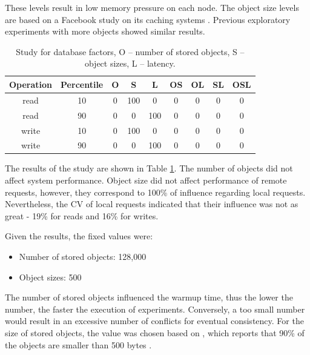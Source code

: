 \documentclass[man,floatsintext,12pt]{apa6}
\begin{document}
These levels result in low memory pressure on each node. The object size levels
are based on a Facebook study on its caching systems \parencite{Atikoglu2012}.
Previous exploratory experiments with more objects showed similar results.

\begin{table}[h!]
  \caption{Study for database factors, O -- number of stored objects, S -- object
sizes, L -- latency.}
  \begin{tabular}{ccccccccc}         \toprule
Operation & Percentile & O & S & L & OS & OL & SL & OSL\\ \midrule

read & 10 & 0 & 100 & 0 & 0 & 0 & 0 & 0 \\

read & 90 & 0 & 0 & 100 & 0 & 0 & 0 & 0 \\

write & 10 & 0 & 100 & 0 & 0 & 0 & 0 & 0 \\

write & 90 & 0 & 0 & 100 & 0 & 0 & 0 & 0 \\ \bottomrule
  \end{tabular}
  \label{tab:estudo_para_fatores_de_banco_de_dados}
\end{table}

The results of the study are shown in Table
\ref{tab:estudo_para_fatores_de_banco_de_dados}. The number of objects did not
affect system performance. Object size did not affect performance of remote
requests, however, they correspond to 100\% of influence regarding local
requests. Nevertheless, the CV of local requests indicated that their influence
was not as great - 19\% for reads and 16\% for writes.

Given the results, the fixed values were:

\begin{itemize}

\item Number of stored objects: 128,000

\item Object sizes: 500

\end{itemize}

The number of stored objects influenced the warmup time, thus the lower the
number, the faster the execution of experiments. Conversely, a too small number
would result in an excessive number of conflicts for eventual consistency. For
the size of stored objects, the value was chosen based on
\parencite{Atikoglu2012}, which reports that 90\% of the objects are smaller
than 500 bytes \parencite{Atikoglu2012}.
\end{document}
